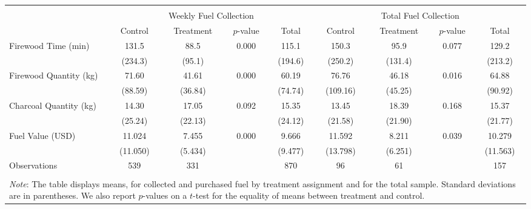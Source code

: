 \begin{tabular}{l*{8}{c}} \\ [-1.8ex]\hline \hline \\[-1.8ex] 
& \multicolumn{4}{c}{Weekly Fuel Collection} & \multicolumn{4}{c}{Total Fuel Collection} \\ 
& \multicolumn{1}{c}{Control} & \multicolumn{1}{c}{Treatment} &  
\multicolumn{1}{c}{$p$-value} & \multicolumn{1}{c}{Total} 
& \multicolumn{1}{c}{Control} & \multicolumn{1}{c}{Treatment} &  
\multicolumn{1}{c}{$p$-value} & \multicolumn{1}{c}{Total} \\ 
\midrule
Firewood Time (min)&       131.5&        88.5&       0.000&       115.1&       150.3&        95.9&       0.077&       129.2\\
            &     (234.3)&      (95.1)&            &     (194.6)&     (250.2)&     (131.4)&            &     (213.2)\\
Firewood Quantity (kg)&       71.60&       41.61&       0.000&       60.19&       76.76&       46.18&       0.016&       64.88\\
            &     (88.59)&     (36.84)&            &     (74.74)&    (109.16)&     (45.25)&            &     (90.92)\\
Charcoal Quantity (kg)&       14.30&       17.05&       0.092&       15.35&       13.45&       18.39&       0.168&       15.37\\
            &     (25.24)&     (22.13)&            &     (24.12)&     (21.58)&     (21.90)&            &     (21.77)\\
Fuel Value (USD)&      11.024&       7.455&       0.000&       9.666&      11.592&       8.211&       0.039&      10.279\\
            &    (11.050)&     (5.434)&            &     (9.477)&    (13.798)&     (6.251)&            &    (11.563)\\
 \midrule Observations &  539 &  331 & &  870 & 
   96 &   61 & &  157 \\ 
\hline \hline \\[-1.8ex] \multicolumn{9}{J{\linewidth}}{\small 
\noindent \textit{Note}: The table displays means, for collected and purchased fuel 
by treatment assignment and for the total sample. Standard deviations are in 
parentheses. We also report $p$-values 
on a $t$-test for the equality of means between treatment and control.}  \end{tabular}
